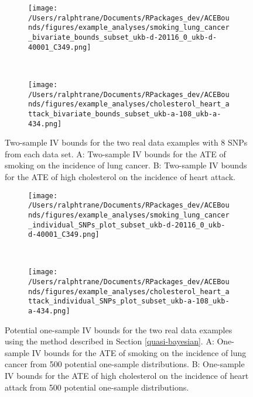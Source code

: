 \documentclass[
]{article}
\theoremstyle{plain}
\begin{document}
\begin{figure*}
  \centering
  \begin{subfigure}{0.5\linewidth}
  \caption{}
  \texttt{[image: /Users/ralphtrane/Documents/RPackages\_dev/ACEBounds/figures/example\_analyses/smoking\_lung\_cancer\_bivariate\_bounds\_subset\_ukb-d-20116\_0\_ukb-d-40001\_C349.png]}
  \label{fig:two-sample-bounds-smoking}
  \end{subfigure}%
  ~
  \begin{subfigure}{0.5\linewidth}
  \caption{}
  \texttt{[image: /Users/ralphtrane/Documents/RPackages\_dev/ACEBounds/figures/example\_analyses/cholesterol\_heart\_attack\_bivariate\_bounds\_subset\_ukb-a-108\_ukb-a-434.png]}
  \label{fig:two-sample-bounds-cholesterol}
  \end{subfigure}
  \caption{Two-sample IV bounds for the two real data examples with 8 SNPs from each data set. A: Two-sample IV bounds for the ATE of smoking on the incidence of lung cancer. B: Two-sample IV bounds for the ATE of high cholesterol on the incidence of heart attack.}
  \label{fig:two-sample-bounds}
\end{figure*}

\begin{figure*}
  \centering
  \begin{subfigure}{0.5\linewidth}
  \centering
  \caption{}
  \texttt{[image: /Users/ralphtrane/Documents/RPackages\_dev/ACEBounds/figures/example\_analyses/smoking\_lung\_cancer\_individual\_SNPs\_plot\_subset\_ukb-d-20116\_0\_ukb-d-40001\_C349.png]}
  \label{fig:one-sample-bounds-smoking}
  \end{subfigure}%
  ~
  \begin{subfigure}{0.5\linewidth}
  \centering
  \caption{}
  \texttt{[image: /Users/ralphtrane/Documents/RPackages\_dev/ACEBounds/figures/example\_analyses/cholesterol\_heart\_attack\_individual\_SNPs\_plot\_subset\_ukb-a-108\_ukb-a-434.png]}
  \label{fig:one-sample-bounds-cholesterol}
  \end{subfigure}
  \caption{Potential one-sample IV bounds for the two real data examples using the method described in Section \ref{quasi-bayesian}. A: One-sample IV bounds for the ATE of smoking on the incidence of lung cancer from 500 potential one-sample distributions. B: One-sample IV bounds for the ATE of high cholesterol on the incidence of heart attack from 500 potential one-sample distributions.}
  \label{fig:one-sample-bounds}
\end{figure*}
\end{document}
